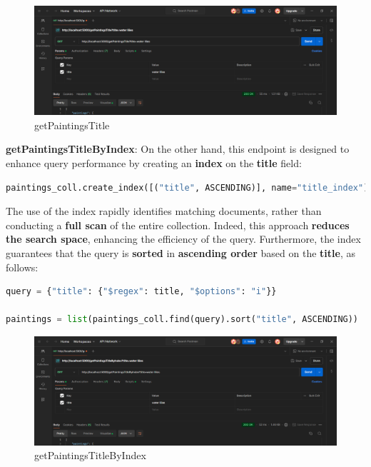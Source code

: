 \documentclass[a4paper,12pt]{article}
\begin{document}
\begin{figure}[h]
      \centering
      \includegraphics[width=1\textwidth]{images/getPaintingsTitleS.png}
      \caption{getPaintingsTitle}

\end{figure}

\textbf{getPaintingsTitleByIndex}: On the other hand, this endpoint is designed to enhance query performance by creating an \textbf{index} on the \textbf{title} field:
\begin{lstlisting}[language=Python]
paintings_coll.create_index([("title", ASCENDING)], name="title_index")
\end{lstlisting}
The use of the index rapidly identifies matching documents, rather than conducting a \textbf{full scan} of the entire collection. Indeed, this approach \textbf{reduces the search space}, enhancing the efficiency of the query. Furthermore, the index guarantees that the query is \textbf{sorted} in \textbf{ascending order} based on the \textbf{title}, as follows:
\begin{lstlisting}[language=Python]
query = {"title": {"$regex": title, "$options": "i"}}

paintings = list(paintings_coll.find(query).sort("title", ASCENDING))
\end{lstlisting}

\begin{figure}[h]
      \centering
      \includegraphics[width=1\textwidth]{images/getPaintingsTitleByIndexS.png}
      \caption{getPaintingsTitleByIndex}
\end{figure}
\end{document}
